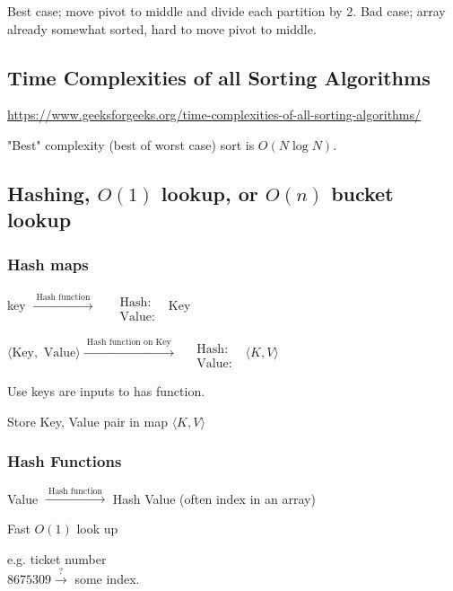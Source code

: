 \documentclass[10pt]{amsart}
\begin{document}
\begin{multicols*}{2}
Best case; move pivot to middle and divide each partition by 2.
Bad case; array already somewhat sorted, hard to move pivot to middle.


\subsection{Time Complexities of all Sorting Algorithms}

\url{https://www.geeksforgeeks.org/time-complexities-of-all-sorting-algorithms/}

"Best" complexity (best of worst case) sort is $O(N \log{N})$.

\subsection{Hashing, $O(1)$ lookup, or $O(n)$ bucket lookup}


\subsubsection{Hash maps} 

key $\xrightarrow{ \text{ Hash function } }$  $\begin{aligned} & \quad \\ 
& \text{ Hash: } \\
& \text{ Value: } \end{aligned}$ Key 

$\langle \text{Key}, \text{ Value} \rangle \xrightarrow{ \text{ Hash function on Key } } \begin{aligned} & \quad \\ 
& \text{ Hash: } \\
& \text{ Value: } \end{aligned}$ \quad $\langle K , V \rangle$ 

Use keys are inputs to has function.

Store Key, Value pair in map $\langle K, V \rangle$

\subsubsection{Hash Functions}

Value $\xrightarrow{ \text{ Hash function } }$ Hash Value (often index in an array)

Fast $O(1)$ look up

e.g. ticket number  \\
$8675309 \xrightarrow{?} $ some index.


\end{multicols*}
\end{document}
